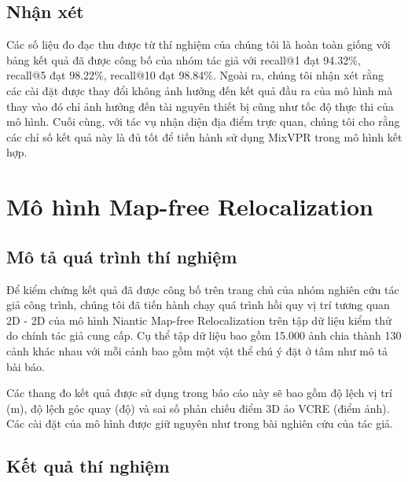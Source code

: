 \subsection*{Nhận xét}

Các số liệu đo đạc thu được từ thí nghiệm của chúng tôi là hoàn toàn giống với bảng kết quả đã được công bố của nhóm tác giả với recall@1 đạt 94.32\%, recall@5 đạt 98.22\%, recall@10 đạt 98.84\%. Ngoài ra, chúng tôi nhận xét rằng các cài đặt được thay đổi không ảnh hưởng đến kết quả đầu ra của mô hình mà thay vào đó chỉ ảnh hưởng đến tài nguyên thiết bị cũng như tốc độ thực thi của mô hình. Cuối cùng, với tác vụ nhận diện địa điểm trực quan, chúng tôi cho rằng các chỉ số kết quả này là đủ tốt để tiến hành sử dụng MixVPR trong mô hình kết hợp.

\section{Mô hình Map-free Relocalization}
\subsection*{Mô tả quá trình thí nghiệm}

Để kiểm chứng kết quả đã được công bố trên trang chủ của nhóm nghiên cứu tác giả công trình, chúng tôi đã tiến hành chạy quá trình hồi quy vị trí tương quan 2D - 2D của mô hình Niantic Map-free Relocalization trên tập dữ liệu kiểm thử do chính tác giả cung cấp. Cụ thể tập dữ liệu bao gồm 15.000 ảnh chia thành 130 cảnh khác nhau với mỗi cảnh bao gồm một vật thể chú ý đặt ở tâm như mô tả bài báo.

Các thang đo kết quả được sử dụng trong báo cáo này sẽ bao gồm độ lệch vị trí (m), độ lệch góc quay (độ) và sai số phản chiếu điểm 3D ảo VCRE (điểm ảnh). Các cài đặt của mô hình được giữ nguyên như trong bài nghiên cứu của tác giả.

\subsection*{Kết quả thí nghiệm}

